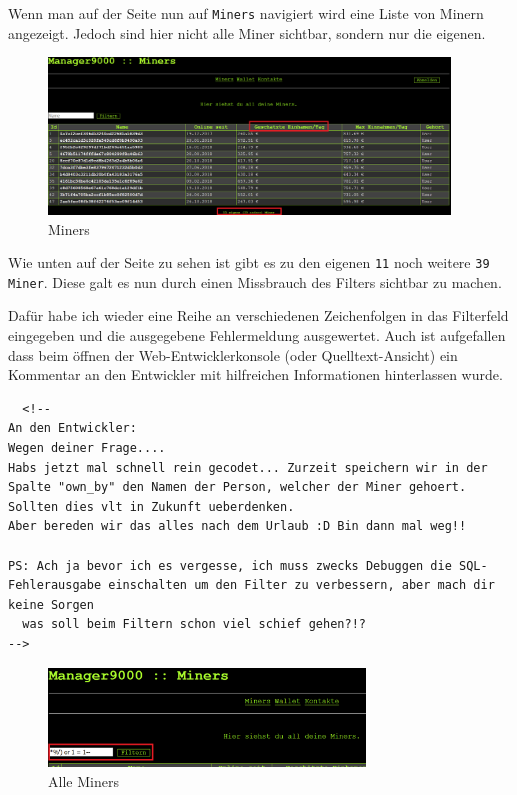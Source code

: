 \documentclass[12pt,a4paper,titlepage,oneside]{scrartcl}
\begin{document}
Wenn man auf der Seite nun auf \lstinline{Miners} navigiert wird eine Liste von Minern angezeigt.
Jedoch sind hier nicht alle Miner sichtbar, sondern nur die eigenen.

\begin{figure}[h!]
  \centering
  \includegraphics[width=0.95\textwidth]{./imgs/manager9000/miners_red.png}
\caption{Miners}
\label{fig:miners}
\end{figure}

Wie unten auf der Seite zu sehen ist gibt es zu den eigenen \lstinline{11} noch weitere \lstinline{39 Miner}.
Diese galt es nun durch einen Missbrauch des Filters sichtbar zu machen.

Dafür habe ich wieder eine Reihe an verschiedenen Zeichenfolgen in das Filterfeld eingegeben und die ausgegebene Fehlermeldung ausgewertet.
Auch ist aufgefallen dass beim öffnen der Web-Entwicklerkonsole (oder Quelltext-Ansicht) ein Kommentar an den Entwickler mit hilfreichen Informationen hinterlassen wurde.

\begin{lstlisting}
  <!--
An den Entwickler:
Wegen deiner Frage....
Habs jetzt mal schnell rein gecodet... Zurzeit speichern wir in der Spalte "own_by" den Namen der Person, welcher der Miner gehoert. Sollten dies vlt in Zukunft ueberdenken.
Aber bereden wir das alles nach dem Urlaub :D Bin dann mal weg!!

PS: Ach ja bevor ich es vergesse, ich muss zwecks Debuggen die SQL-Fehlerausgabe einschalten um den Filter zu verbessern, aber mach dir keine Sorgen
  was soll beim Filtern schon viel schief gehen?!?
-->
\end{lstlisting}

\begin{figure}[h!]
  \centering
  \includegraphics[width=0.75\textwidth]{./imgs/manager9000/all_miners_red.png}
\caption{Alle Miners}
\label{fig:all_miners}
\end{figure}
\end{document}
